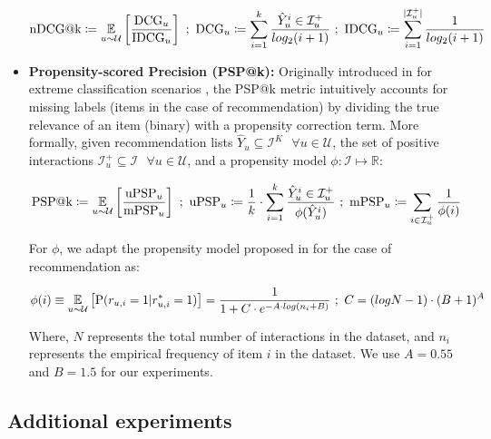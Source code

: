 \documentclass{article}
\begin{document}
\begin{itemize}[leftmargin=.3in]
    \begin{equation*}
        \text{nDCG@k} \coloneqq \underset{u \sim \mathcal{U}}{\mathbb{E}} \left[\frac{\text{DCG}_u}{\text{IDCG}_u}\right] ~;~ \text{DCG}_u \coloneqq \sum_{i=1}^{k} \frac{\hat{Y}_u^i \in \mathcal{I}_u^+}{log_2(i+1)} ~;~ \text{IDCG}_u \coloneqq \sum_{i=1}^{|\mathcal{I}_u^+|} \frac{1}{log_2(i+1)}
    \end{equation*}
    
    \item \textbf{Propensity-scored Precision (PSP@k):} Originally introduced in \cite{pfastre} for extreme classification scenarios \cite{parabel, slice, eclare}, the PSP@k metric intuitively accounts for missing labels (items in the case of recommendation) by dividing the true relevance of an item (binary) with a propensity correction term. More formally, given recommendation lists $\hat{Y}_u \subseteq \mathcal{I}^K ~~~ \forall u \in \mathcal{U}$, the set of positive interactions $\mathcal{I}_u^+ \subseteq \mathcal{I} ~~~ \forall u \in \mathcal{U}$, and a propensity model $\phi : \mathcal{I} \mapsto \mathbb{R}$:
    
    \begin{equation*}
        \text{PSP@k} \coloneqq \underset{u \sim \mathcal{U}}{\mathbb{E}} \left[\frac{\text{uPSP}_u}{\text{mPSP}_u}\right] ~;~ \text{uPSP}_u \coloneqq \frac{1}{k} \cdot \sum_{i=1}^{k} \frac{\hat{Y}_u^i \in \mathcal{I}_u^+}{\phi(\hat{Y}_u^i)} ~;~ \text{mPSP}_u \coloneqq \sum_{i \in \mathcal{I}_u^+} \frac{1}{\phi(i)}
    \end{equation*}
    
    For $\phi$, we adapt the propensity model proposed in \cite{pfastre} for the case of recommendation as:
    
    \begin{equation*}
        \phi(i) \equiv \underset{u \sim \mathcal{U}}{\mathbb{E}} \left[\text{P}(r_{u, i} = 1 | r^*_{u, i} = 1)\right] = \frac{1}{1 + C \cdot e^{-A \cdot log(n_i + B)}} ~;~ C = (logN - 1) \cdot (B+1)^A
    \end{equation*}
    
    Where, $N$ represents the total number of interactions in the dataset, and $n_i$ represents the empirical frequency of item $i$ in the dataset. We use $A = 0.55$ and $B = 1.5$ for our experiments.
\end{itemize}

\subsection{Additional experiments} \label{appendix:extra_experiments}
\end{document}
